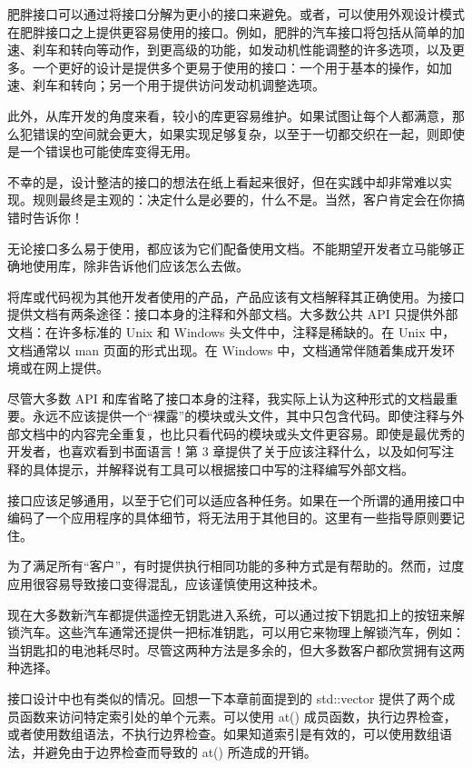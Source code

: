 肥胖接口可以通过将接口分解为更小的接口来避免。或者，可以使用外观设计模式在肥胖接口之上提供更容易使用的接口。例如，肥胖的汽车接口将包括从简单的加速、刹车和转向等动作，到更高级的功能，如发动机性能调整的许多选项，以及更多。一个更好的设计是提供多个更易于使用的接口：一个用于基本的操作，如加速、刹车和转向；另一个用于提供访问发动机调整选项。

此外，从库开发的角度来看，较小的库更容易维护。如果试图让每个人都满意，那么犯错误的空间就会更大，如果实现足够复杂，以至于一切都交织在一起，则即使是一个错误也可能使库变得无用。

不幸的是，设计整洁的接口的想法在纸上看起来很好，但在实践中却非常难以实现。规则最终是主观的：决定什么是必要的，什么不是。当然，客户肯定会在你搞错时告诉你！


无论接口多么易于使用，都应该为它们配备使用文档。不能期望开发者立马能够正确地使用库，除非告诉他们应该怎么去做。

将库或代码视为其他开发者使用的产品，产品应该有文档解释其正确使用。为接口提供文档有两条途径：接口本身的注释和外部文档。大多数公共 API 只提供外部文档：在许多标准的 Unix 和 Windows 头文件中，注释是稀缺的。在 Unix 中，文档通常以 man 页面的形式出现。在 Windows 中，文档通常伴随着集成开发环境或在网上提供。

尽管大多数 API 和库省略了接口本身的注释，我实际上认为这种形式的文档最重要。永远不应该提供一个“裸露”的模块或头文件，其中只包含代码。即使注释与外部文档中的内容完全重复，也比只看代码的模块或头文件更容易。即使是最优秀的开发者，也喜欢看到书面语言！第 3 章提供了关于应该注释什么，以及如何写注释的具体提示，并解释说有工具可以根据接口中写的注释编写外部文档。


接口应该足够通用，以至于它们可以适应各种任务。如果在一个所谓的通用接口中编码了一个应用程序的具体细节，将无法用于其他目的。这里有一些指导原则要记住。


为了满足所有“客户”，有时提供执行相同功能的多种方式是有帮助的。然而，过度应用很容易导致接口变得混乱，应该谨慎使用这种技术。

现在大多数新汽车都提供遥控无钥匙进入系统，可以通过按下钥匙扣上的按钮来解锁汽车。这些汽车通常还提供一把标准钥匙，可以用它来物理上解锁汽车，例如：当钥匙扣的电池耗尽时。尽管这两种方法是多余的，但大多数客户都欣赏拥有这两种选择。

接口设计中也有类似的情况。回想一下本章前面提到的 std::vector 提供了两个成员函数来访问特定索引处的单个元素。可以使用 at() 成员函数，执行边界检查，或者使用数组语法，不执行边界检查。如果知道索引是有效的，可以使用数组语法，并避免由于边界检查而导致的 at() 所造成的开销。

